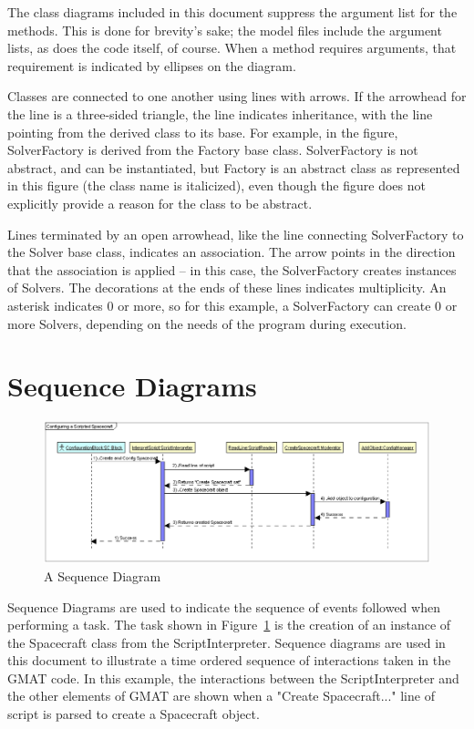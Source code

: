 The class diagrams included in this document suppress the argument list for the methods.  This is
done for brevity's sake; the model files include the argument lists, as does the code itself, of
course.  When a method requires arguments, that requirement is indicated by ellipses on the diagram.

Classes are connected to one another using lines with arrows.  If the arrowhead for the line is a
three-sided triangle, the line indicates inheritance, with the line pointing from the derived class
to its base.  For example, in the figure, SolverFactory is derived from the Factory base class. 
SolverFactory is not abstract, and can be instantiated, but Factory is an abstract class as
represented in this figure (the class name is italicized), even though the figure does not
explicitly provide a reason for the class to be abstract.

Lines terminated by an open arrowhead, like the line connecting SolverFactory to the Solver base
class, indicates an association.  The arrow points in the direction that the association is applied
-- in this case, the SolverFactory creates instances of Solvers.  The decorations at the ends of
these lines indicates multiplicity.  An asterisk indicates 0 or more, so for this example, a
SolverFactory can create 0 or more Solvers, depending on the needs of the program during execution.

\section{Sequence Diagrams}

\begin{figure}[htb]
\begin{center}
\includegraphics[scale=0.45]{Images/UmlSequenceSample.eps}
\caption{\label{figure:UmlSequenceExample}A Sequence Diagram}
\end{center}
\end{figure}

Sequence Diagrams are used to indicate the sequence of events followed when performing a task.  The
task shown in Figure~\ref{figure:UmlSequenceExample} is the creation of an instance of the
Spacecraft class from the ScriptInterpreter.  Sequence diagrams are used in this document to
illustrate a time ordered sequence of interactions taken in the GMAT code.  In this example, the
interactions between the ScriptInterpreter and the other elements of GMAT are shown when a "Create
Spacecraft..." line of script is parsed to create a Spacecraft object.

